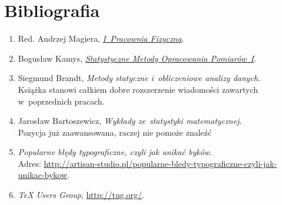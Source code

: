 \documentclass[a4paper,11pt]{article}
\begin{document}
\section*{Bibliografia}

\begin{enumerate}
\item Red. Andrzej Magiera,
  \href{http://www.1pf.if.uj.edu.pl/documents/5046939/5227638/skrypt.pdf}{\emph{I~Pracownia
      Fizyczna}}.
\item Bogusław Kamys,
  \href{http://users.uj.edu.pl/\~ufkamys/BK/smop1N\_h.pdf}{\emph{Statystyczne
      Metody Opracowania Pomiarów~I}}.
\item Siegmund Brandt, \emph{Metody statyczne i~obliczeniowe analizy
    danych}. \\
  Książka stanowi całkiem dobre rozszerzenie wiadomości zawartych
  w~poprzednich pracach.
\item Jarosław Bartoszewicz, \emph{Wykłady ze~statystyki matematycznej}. \\
  Pozycja już zaawansowana, raczej nie pomoże znaleźć 
\item \emph{Popularne
    błędy typograficzne, czyli jak unikać byków}. \\
  Adres:
  \href{http://artisan-studio.pl/popularne-bledy-typograficzne-czyli-jak-unikac-bykow}{http://artisan-studio.pl/popularne-bledy-typograficzne-czyli-jak-unikac-bykow}.
\item \emph{\TeX{} Users Group},
  \href{http://tug.org/}{http://tug.org/}.
\end{enumerate}






\end{document}
